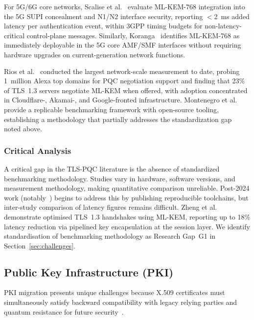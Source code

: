 \documentclass[journal]{IEEEtran}
\begin{document}
For 5G/6G core networks, Scalise et al.~\cite{scalise20245g} evaluate
ML-KEM-768 integration into the 5G SUPI concealment and N1/N2 interface
security, reporting $<$2~ms added latency per authentication event, within
3GPP timing budgets for non-latency-critical control-plane messages.
Similarly, Koranga~\cite{koranga2025saving} identifies ML-KEM-768 as
immediately deployable in the 5G core AMF/SMF interfaces without requiring
hardware upgrades on current-generation network functions.

Rios et al.~\cite{rios2025quantum} conducted the largest network-scale
measurement to date, probing 1~million Alexa top domains for PQC negotiation
support and finding that 23\% of TLS~1.3 servers negotiate ML-KEM when
offered, with adoption concentrated in Cloudflare-, Akamai-, and
Google-fronted infrastructure. Montenegro et al.~\cite{montenegro2025performance}
provide a replicable benchmarking framework with open-source tooling,
establishing a methodology that partially addresses the standardization gap
noted above.

\subsubsection{Critical Analysis}

A critical gap in the TLS-PQC literature is the absence of standardized
benchmarking methodology. Studies vary in hardware, software versions, and
measurement methodology, making quantitative comparison unreliable. Post-2024
work (notably~\cite{alnahawi2024comprehensive,rios2025quantum,montenegro2025performance,zheng2024mlkemtls})
begins to address this by publishing reproducible toolchains, but inter-study
comparison of latency figures remains difficult. Zheng et al.~\cite{zheng2024mlkemtls}
demonstrate optimised TLS~1.3 handshakes using ML-KEM, reporting up to 18\%
latency reduction via pipelined key encapsulation at the session layer. We
identify standardisation of benchmarking methodology as Research Gap~G1 in
Section~\ref{sec:challenges}.

\subsection{Public Key Infrastructure (PKI)}
\label{sec:pki}

PKI migration presents unique challenges because X.509 certificates must
simultaneously satisfy backward compatibility with legacy relying parties
and quantum resistance for future security~\cite{ott2019identifying}.
\end{document}
